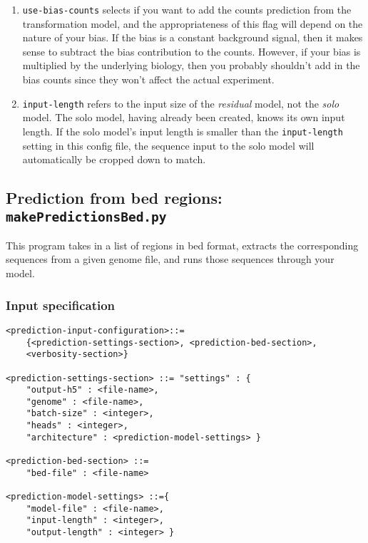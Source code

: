 \documentclass{article}
\begin{document}
\begin{enumerate}
    \item \texttt{use-bias-counts} selects if you want to add the counts prediction from the transformation model, and the appropriateness of this flag will depend on the nature of your bias. 
        If the bias is a constant background signal, then it makes sense to subtract the bias contribution to the counts. 
        However, if your bias is multiplied by the underlying biology, then you probably shouldn't add in the bias counts since they won't affect the actual experiment.
    \item \texttt{input-length} refers to the input size of the \emph{residual} model, not the \emph{solo} model.
        The solo model, having already been created, knows its own input length.
        If the solo model's input length is smaller than the \texttt{input-length} setting in this config file, the sequence input to the solo model will automatically be cropped down to match. 
\end{enumerate}




\newpage

\subsection{Prediction from bed regions: \texttt{makePredictionsBed.py}}

This program takes in a list of regions in bed format, extracts the corresponding sequences from a given genome file, and runs those sequences through your model.


\subsubsection{Input specification}

\begin{lstlisting}
<prediction-input-configuration>::=
    {<prediction-settings-section>, <prediction-bed-section>,
    <verbosity-section>}

<prediction-settings-section> ::= "settings" : {
    "output-h5" : <file-name>,
    "genome" : <file-name>,
    "batch-size" : <integer>,
    "heads" : <integer>,
    "architecture" : <prediction-model-settings> }

<prediction-bed-section> ::=
    "bed-file" : <file-name>

<prediction-model-settings> ::={
    "model-file" : <file-name>,
    "input-length" : <integer>,
    "output-length" : <integer> }
\end{lstlisting}
\end{document}
